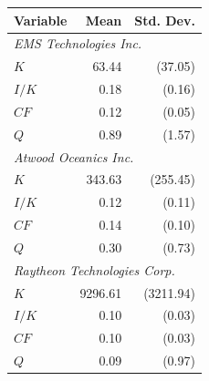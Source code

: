 \begin{tabular}{lrr}
\toprule
Variable & Mean & Std. Dev. \\
\midrule
\multicolumn{3}{l}{\textit{EMS Technologies Inc.}} \\
$K$ & 63.44 & (37.05) \\
$I/K$ & 0.18 & (0.16) \\
$CF$ & 0.12 & (0.05) \\
$Q$ & 0.89 & (1.57) \\
\multicolumn{3}{l}{\textit{Atwood Oceanics Inc.}} \\
$K$ & 343.63 & (255.45) \\
$I/K$ & 0.12 & (0.11) \\
$CF$ & 0.14 & (0.10) \\
$Q$ & 0.30 & (0.73) \\
\multicolumn{3}{l}{\textit{Raytheon Technologies Corp.}} \\
$K$ & 9296.61 & (3211.94) \\
$I/K$ & 0.10 & (0.03) \\
$CF$ & 0.10 & (0.03) \\
$Q$ & 0.09 & (0.97) \\
\bottomrule
\end{tabular}
